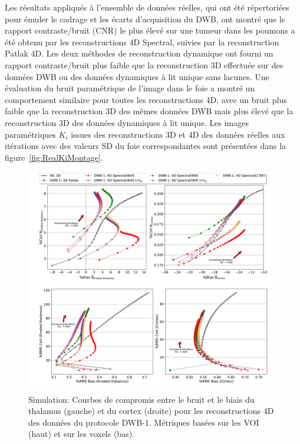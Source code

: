 \documentclass[a4paper]{article}
\begin{document}
Les résultats appliqués à l'ensemble de données réelles, qui ont été répertoriées pour émuler le cadrage et les écarts d'acquisition du DWB, ont montré que le rapport contraste/bruit (CNR) le plus élevé sur une tumeur dans les poumons a été obtenu par les reconstructions 4D Spectral, suivies par la reconstruction Patlak 4D. Les deux méthodes de reconstruction dynamique ont fourni un rapport contraste/bruit plus faible que la reconstruction 3D effectuée sur des données DWB ou des données dynamiques à lit unique sans lacunes. Une évaluation du bruit paramétrique de l'image dans le foie a montré un comportement similaire pour toutes les reconstructions 4D, avec un bruit plus faible que la reconstruction 3D des mêmes données DWB mais plus élevé que la reconstruction 3D des données dynamiques à lit unique.
Les images paramétriques $K_i$ issues des reconstructions 3D et 4D des données réelles aux itérations avec des valeurs SD du foie correspondantes sont présentées dans la figure~\ref{fig:RealKiMontage}. 
%
\begin{figure} [ht!]
\centering
\includegraphics[scale=0.42,angle=0]{3_2.pdf}
\caption{Simulation: Courbes de compromis entre le bruit et le biais du thalamus (gauche) et du cortex (droite) pour les reconstructions 4D des données du protocole DWB-1. Métriques basées sur les VOI (haut) et sur les voxels (bas).}
\label{fig:3_2_DynamicModels}
\end{figure} 
%
\end{document}
